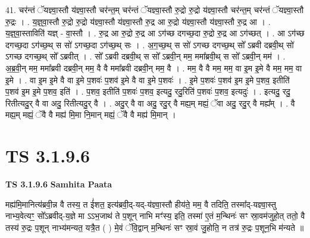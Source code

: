 \documentclass[17pt]{extarticle}
\begin{document}
41. चर॑न्तं ॅयज्ञ्वा॒स्तौ य॑ज्ञ्वा॒स्तौ चर॑न्त॒म् चर॑न्तं ॅयज्ञ्वा॒स्तौ रु॒द्रो रु॒द्रो य॑ज्ञ्वा॒स्तौ चर॑न्त॒म् चर॑न्तं ॅयज्ञ्वा॒स्तौ रु॒द्रः । . य॒ज्ञ्॒वा॒स्तौ रु॒द्रो रु॒द्रो य॑ज्ञ्वा॒स्तौ य॑ज्ञ्वा॒स्तौ रु॒द्र आ रु॒द्रो य॑ज्ञ्वा॒स्तौ य॑ज्ञ्वा॒स्तौ रु॒द्र आ । . य॒ज्ञ्॒वा॒स्ताविति॑ यज्ञ् - वा॒स्तौ । . रु॒द्र आ रु॒द्रो रु॒द्र आ ऽग॑च्छ दगच्छ॒दा रु॒द्रो रु॒द्र आ ऽग॑च्छत् । . आ ऽग॑च्छ दगच्छ॒दा ऽग॑च्छ॒थ् स सो॑ ऽगच्छ॒दा ऽग॑च्छ॒थ् सः । . अ॒ग॒च्छ॒थ् स सो॑ ऽगच्छ दगच्छ॒थ् सो᳚ ऽब्रवी दब्रवी॒थ् सो॑ ऽगच्छ दगच्छ॒थ् सो᳚ ऽब्रवीत् । . सो᳚ ऽब्रवी दब्रवी॒थ् स सो᳚ ऽब्रवी॒न् मम॒ ममा᳚ब्रवी॒थ् स सो᳚ ऽब्रवी॒न् मम॑ । . अ॒ब्र॒वी॒न् मम॒ ममा᳚ब्रवी दब्रवी॒न् मम॒ वै वै ममा᳚ब्रवी दब्रवी॒न् मम॒ वै । . मम॒ वै वै मम॒ मम॒ वा इ॒म इ॒मे वै मम॒ मम॒ वा इ॒मे । . वा इ॒म इ॒मे वै वा इ॒मे प॒शवः॑ प॒शव॑ इ॒मे वै वा इ॒मे प॒शवः॑ । . इ॒मे प॒शवः॑ प॒शव॑ इ॒म इ॒मे प॒शव॒ इतीति॑ प॒शव॑ इ॒म इ॒मे प॒शव॒ इति॑ । . प॒शव॒ इतीति॑ प॒शवः॑ प॒शव॒ इत्यदु॒ रदु॒रिति॑ प॒शवः॑ प॒शव॒ इत्यदुः॑ । . इत्यदु॒ रदु॒ रितीत्यदु॒र् वै वा अदु॒ रितीत्यदु॒र् वै । . अदु॒र् वै वा अदु॒ रदु॒र् वै मह्य॒म् मह्यं॒ ॅवा अदु॒ रदु॒र् वै मह्य᳚म् । . वै मह्य॒म् मह्यं॒ ॅवै वै मह्य॑ मि॒मा नि॒मान् मह्यं॒ ॅवै वै मह्य॑ मि॒मान् । \newline
\pagebreak
{}

\section{ TS 3.1.9.6 }

\textbf{TS 3.1.9.6 } \newline
\textbf{Samhita Paata} \newline

मह्य॑मि॒मानित्य॑ब्रवी॒न्न वै तस्य॒ त ई॑शत॒ इत्य॑ब्रवी॒द्-यद्-य॑ज्ञ्वा॒स्तौ हीय॑ते॒ मम॒ वै तदिति॒ तस्मा᳚द्-यज्ञ्वा॒स्तु नाभ्य॒वेत्यꣳ॒॒ सो᳚ऽब्रवीद्-य॒ज्ञे मा ऽऽभ॒जाथ॑ ते प॒शून् नाभि मꣳ॑स्य॒ इति॒ तस्मा॑ ए॒तं म॒न्थिनः॑ सꣳ स्रा॒वम॑जुहो॒त् ततो॒ वै तस्य॑ रु॒द्रः प॒शून् नाभ्य॑मन्यत॒ यत्रै॒त ( ) मे॒वं ॅवि॒द्वान् म॒न्थिनः॑ सꣳ स्रा॒वं जु॒होति॒ न तत्र॑ रु॒द्रः प॒शून॒भि म॑न्यते ॥ \newline
\end{document}
